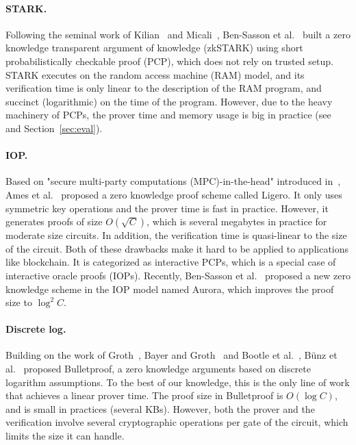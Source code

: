 \paragraph{STARK.} Following the seminal work of Kilian~\cite{Kilian92} and Micali~\cite{Micali00}, Ben-Sasson et al.~\cite{libstark} built a zero knowledge transparent argument of knowledge (zkSTARK) using short probabilistically checkable proof (PCP), which does not rely on trusted setup. STARK executes on the random access machine (RAM) model, and its verification time is only linear to the description of the RAM program, and succinct (logarithmic) on the time of the program.  However, due to the heavy machinery of PCPs, the prover time and memory usage is big in practice (see~\cite{hyrax} and Section~\ref{sec:eval}). 

\paragraph{IOP.} Based on "secure multi-party computations (MPC)-in-the-head" introduced in~\cite{ishai2007zero,giacomelli2016zkboo,chase2017post}, Ames et al.~\cite{ligero} proposed a zero knowledge proof scheme called Ligero. It only uses symmetric key operations and the prover time is fast in practice. However, it generates proofs of size $O(\sqrt{C})$, which is several megabytes in practice for moderate size circuits. In addition, the verification time is quasi-linear to the size of the circuit. Both of these drawbacks make it hard to be applied to applications like blockchain. It is categorized as interactive PCPs, which is a special case of interactive oracle proofs (IOPs). Recently, Ben-Sasson et al.~\cite{aurora} proposed a new zero knowledge scheme in the IOP model named Aurora, which improves the proof size to $\log^2 C$.   

\paragraph{Discrete log.} Building on the work of Groth~\cite{groth2009linear}, Bayer and Groth~\cite{bayer2012efficient} and Bootle et al.~\cite{bootle2016efficient,bootle2017linear}, B{\"u}nz et al.~\cite{bulletproofs} proposed Bulletproof, a zero knowledge arguments based on discrete logarithm assumptions. To the best of our knowledge, this is the only line of work that achieves a linear prover time. The proof size in Bulletproof is $O(\log C)$, and is small in practices (several KBs). However, both the prover and the verification involve several cryptographic operations per gate of the circuit, which limits the size it can handle.

